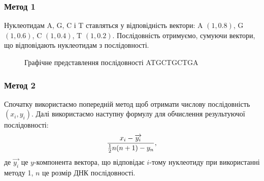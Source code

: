 \documentclass[mathserif,serif,10pt]{beamer}
\begin{document}
\begin{frame}
 \frametitle{Метод 1}
Нуклеотидам A, G, C і T ставляться у відповідність вектори: A $(1,0.8)$, G $(1,0.6)$, C $(1,0.4)$, T $(1,0.2)$.
Послідовність отримуємо, сумуючи вектори, що відповідають нуклеотидам з послідовності.
\begin{figure}
\begin{center}
\end{center}
\caption{Графічне представлення послідовності ATGCTGCTGA}
\label{fig:1}
\end{figure}
\end{frame}

\begin{frame}
\frametitle{Метод 2}
Спочатку використаємо попередній метод щоб отримати числову послідовність $(x_i,y_i)$. Далі використаємо наступну формулу для обчислення результуючої послідовності:
\[{x_i-\overrightarrow{y_i} \over{{1\over2}n(n+1)-y_n}},\]
де $\overrightarrow{y_i}$ це $y$-компонента вектора, що відповідає $i$-тому нуклеотиду при використанні методу 1, $n$ це розмір ДНК послідовності.
\end{frame}
\end{document}
